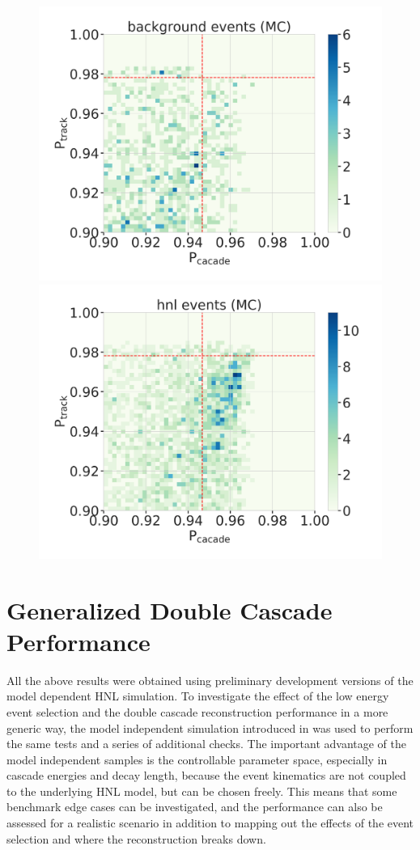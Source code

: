 \begin{figure}[h]
	\centering
    \includegraphics[width=0.49\linewidth]{figures/results/190607/classification/cascade_vs_track_class_prob_background_full_stats.png}
    \includegraphics[width=0.49\linewidth]{figures/results/190607/classification/cascade_vs_track_class_prob_hnl_full_stats.png}
    \caption[]{}
\end{figure}


\section{Generalized Double Cascade Performance}


All the above results were obtained using preliminary development versions of the model dependent HNL simulation. To investigate the effect of the low energy event selection and the double cascade reconstruction performance in a more generic way, the model independent simulation introduced in  was used to perform the same tests and a series of additional checks. The important advantage of the model independent samples is the controllable parameter space, especially in cascade energies and decay length, because the event kinematics are not coupled to the underlying HNL model, but can be chosen freely. This means that some benchmark edge cases can be investigated, and the performance can also be assessed for a realistic scenario in addition to mapping out the effects of the event selection and where the reconstruction breaks down.


